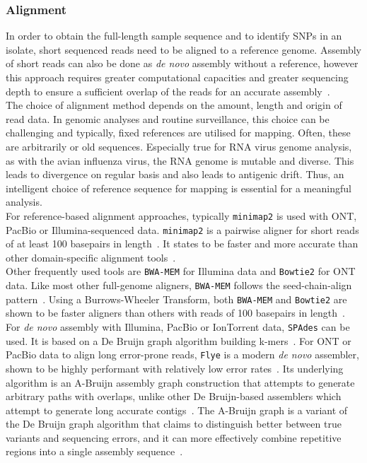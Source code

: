 \subsubsection*{Alignment}
In order to obtain the full-length sample sequence and to identify \acp{SNP} in an isolate, short sequenced reads need to be aligned to a reference genome. Assembly of short reads can also be done as \textit{de novo} assembly without a reference, however this approach requires greater computational capacities and greater sequencing depth to ensure a sufficient overlap of the reads for an accurate assembly~\cite{ekblom2014field}. \\
The choice of alignment method depends on the amount, length and origin of read data. In genomic analyses and routine surveillance, this choice can be challenging and typically, fixed references are utilised for mapping. Often, these are arbitrarily or old sequences. Especially true for RNA virus genome analysis, as with the avian influenza virus, the RNA genome is mutable and diverse. This leads to divergence on regular basis and also leads to antigenic drift. Thus, an intelligent choice of reference sequence for mapping is essential for a meaningful analysis. \\
For reference-based alignment approaches, typically \texttt{minimap2} is used with \ac{ONT}, PacBio or Illumina-sequenced data. \texttt{minimap2} is a pairwise aligner for short reads of at least 100 basepairs in length~\cite{li2018minimap2}. It states to be faster and more accurate than other domain-specific alignment tools~\cite{li2018minimap2}. \\
Other frequently used tools are \texttt{BWA-MEM} for Illumina data and \texttt{Bowtie2} for \ac{ONT} data. Like most other full-genome aligners, \texttt{BWA-MEM} follows the seed-chain-align pattern~\cite{li2013aligning}. Using a Burrows-Wheeler Transform, both \texttt{BWA-MEM} and \texttt{Bowtie2} are shown to be faster aligners than others with reads of 100 basepairs in length~\cite{borozan2013evaluation}. \\
For \textit{de novo} assembly with Illumina, PacBio or IonTorrent data, \texttt{SPAdes} can be used. It is based on a De Bruijn graph algorithm building k-mers~\cite{bankevich2012spades}. For \ac{ONT} or PacBio data to align long error-prone reads, \texttt{Flye} is a modern \textit{de novo} assembler, shown to be highly performant with relatively low error rates~\cite{kolmogorov2019assembly, dida2021empirical}. Its underlying algorithm is an A-Bruijn assembly graph construction that attempts to generate arbitrary paths with overlaps, unlike other De Bruijn-based assemblers which attempt to generate long accurate contigs~\cite{kolmogorov2019assembly}. The A-Bruijn graph is a variant of the De Bruijn graph algorithm that claims to distinguish better between true variants and sequencing errors, and it can more effectively combine repetitive regions into a single assembly sequence~\cite{kolmogorov2019assembly}.

